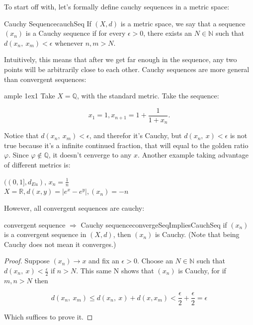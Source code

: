 \documentclass{book}
\newcommand{\Rw}{\Rightarrow}
\let\temp\phi
\let\phi\varphi
\let\varphi\temp
\begin{document}
To start off with, let's formally define cauchy sequences in a metric space:
\begin{defn}{Cauchy Sequence}{cauchSeq}
     If \((X,d)\) is a metric space, we
    say that a sequence \(\left( x_{n} \right)\) is a Cauchy sequence if for
    every \(\epsilon > 0\), there exists an \(N\mathbb{\in N}\) such that
    \(d\left( x_{n},\ x_{m} \right) < \epsilon\) whenever \(n,m > N\).
\end{defn}

Intuitively, this means that after we get far enough in the sequence, any two points will be arbitrarily close to each
other. Cauchy sequences are more general than convergent sequences:
\begin{example}{ample 1}{ex1}
	Take  $X =
	\mathbb{Q}$, with the standard metric. Take the sequence:

	\[x_{1} = 1,x_{n + 1} = 1 + \frac{1}{1 + x_{n}}.\]

	Notice that \(d\left( x_{n},\ x_{m} \right) < \epsilon\), and therefor
	it's Cauchy, but \(d\left( x_{n},\ x \right) < \epsilon\) is not true
	because it's a infinite continued fraction, that will equal to the
	golden ratio \(\phi\). Since \(\phi\notin\mathbb{Q}\), it doesn't
	cenverge to any \(x\). Another example taking advantage of different metrics is:

	\begin{center}
	  $((0,1], d_{Eu})$, $x_{n} = \frac{1}{n}$\\
	  $X = \mathbb{R}, d(x,y) = |e^{x} - e^{y}|, (x_{n}) = -n$
	\end{center}
\end{example}
However, all convergent sequences are cauchy:

\begin{prop}{convergent sequence $\Rw$ Cauchy sequence}{convergeSeqImpliesCauchSeq}
    if \((x_{n})\) is a convergent sequence in
    \((X,d)\), then \(\left( x_{n} \right)\) is Cauchy. (Note that being
    Cauchy does not mean it converges.)
\end{prop}

\begin{proof}
    Suppose \(\left( x_{n} \right) \rightarrow x\) and fix
    an \(\epsilon > 0\). Choose an \(N\mathbb{\in N}\) such that
    \(d\left( x_{n},\ x \right) < \frac{\epsilon}{2}\) if \(n > N\). This
    same N shows that \(\left( x_{n} \right)\) is Cauchy, for if \(m,n > N\)
    then

    \[d\left( x_{n},\ x_{m} \right) \leq d\left( x_{n},\ x \right) + d\left( x,x_{m} \right) < \frac{\epsilon}{2} + \frac{\epsilon}{2} = \epsilon\]

    Which suffices to prove it.
\end{proof}
\end{document}
